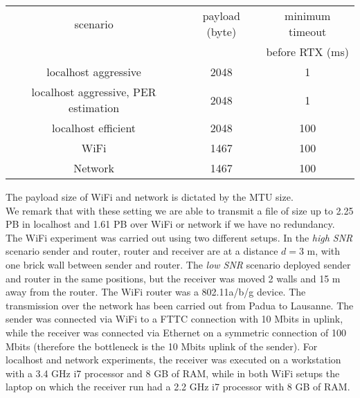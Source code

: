 \begin{center}
\begin{tabular}{ccc}

\toprule
scenario & payload (byte) & minimum timeout\\
 & & before RTX (ms) \\
\midrule
localhost aggressive&2048&1\\
localhost aggressive, PER estimation & 2048 & 1 \\
localhost efficient&2048&100\\
WiFi&1467&100\\
Network&1467&100\\
\bottomrule
\end{tabular}
\end{center}
The payload size of WiFi and network is dictated by the MTU size. \\
We remark that with these setting we are able to transmit a file of size up to 2.25 PB in localhost and 1.61 PB over WiFi or network if we have no redundancy.\\
The WiFi experiment was carried out using two different setups. In the \textit{high SNR} scenario sender and router, router and receiver are at a distance $d= 3$ m, with one brick wall between sender and router. The \textit{low SNR} scenario deployed sender and router in the same positions, but the receiver was moved 2 walls and 15 m away from the router. The WiFi router was a 802.11a/b/g device. 
The transmission over the network has been carried out from Padua to Lausanne. The sender was connected via WiFi to a FTTC connection with 10 Mbits in uplink, while the receiver was connected via Ethernet on a symmetric connection of 100 Mbits (therefore the bottleneck is the 10 Mbits uplink of the sender). For localhost and network experiments, the receiver was executed on a workstation with a 3.4 GHz i7 processor and 8 GB of RAM, while in both WiFi setups the laptop on which the receiver run had a 2.2 GHz i7 processor with 8 GB of RAM.

